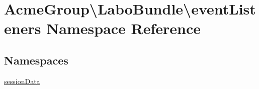 \hypertarget{namespace_acme_group_1_1_labo_bundle_1_1event_listeners}{\section{Acme\+Group\textbackslash{}Labo\+Bundle\textbackslash{}event\+Listeners Namespace Reference}
\label{namespace_acme_group_1_1_labo_bundle_1_1event_listeners}
}
\subsection*{Namespaces}
\begin{DoxyCompactItemize}
\item 
 \hyperlink{namespace_acme_group_1_1_labo_bundle_1_1event_listeners_1_1session_data}{session\+Data}
\end{DoxyCompactItemize}
